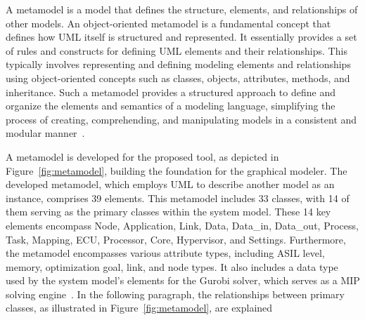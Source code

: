     A metamodel is a model that defines the structure, elements, and relationships of other models.
    An object-oriented metamodel is a fundamental concept that defines how UML itself is structured and represented. It essentially provides a set of rules and constructs for defining UML elements and their relationships. This typically involves representing and defining modeling elements and relationships using object-oriented concepts such as classes, objects, attributes, methods, and inheritance. Such a metamodel provides a structured approach to define and organize the elements and semantics of a modeling language, simplifying the process of creating, comprehending, and manipulating models in a consistent and modular manner~\cite{hailpern2006model, medvidovic2002modeling, 9565115}.
    
    
    

      	



    A metamodel is developed for the proposed tool, as depicted in Figure~\ref{fig:metamodel}, building the foundation for the graphical modeler.
    The developed metamodel, which employs UML to describe another model as an instance, comprises 39 elements. This metamodel includes 33 classes, with 14 of them serving as the primary classes within the system model. These 14 key elements encompass Node, Application, Link, Data, Data\_in, Data\_out, Process, Task, Mapping, ECU, Processor, Core, Hypervisor, and Settings.
    Furthermore, the metamodel encompasses various attribute types, including ASIL level, memory, optimization goal, link, and node types. It also includes a data type used by the system model's elements for the Gurobi solver, which serves as a MIP solving engine~\cite{gurobi}.
    In the following paragraph, the relationships between primary classes, as illustrated in Figure~\ref{fig:metamodel}, are explained    
    
    
